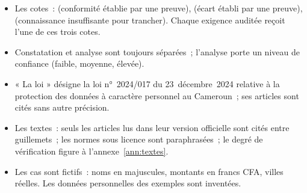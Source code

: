 \begin{itemize}
    \item Les cotes~: \OUI{} (conformité établie par une preuve), \NON{}
          (écart établi par une preuve), \NEK{} (connaissance insuffisante
          pour trancher). Chaque exigence auditée reçoit l'une de ces trois
          cotes.
    \item Constatation et analyse sont toujours séparées~; l'analyse porte
          un niveau de confiance (faible, moyenne, élevée).
    \item « La loi » désigne la loi n°~2024/017 du 23~décembre~2024
          relative à la protection des données à caractère personnel au
          Cameroun~; ses articles sont cités sans autre précision.
    \item Les textes~: seuls les articles lus dans leur version officielle
          sont cités entre guillemets~; les normes sous licence sont
          paraphrasées~; le degré de vérification figure à
          l'annexe~\ref{ann:textes}.
    \item Les cas sont fictifs~: noms en majuscules, montants en francs
          CFA, villes réelles. Les données personnelles des exemples sont
          inventées.
\end{itemize}
